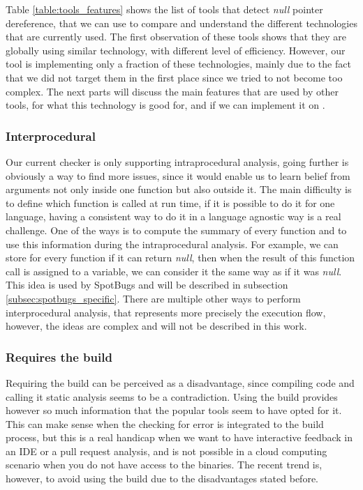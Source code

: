 Table \ref{table:tools_features} shows the list of tools that detect \emph{null} pointer dereference, that we can use to compare and understand the different technologies that are currently used.
The first observation of these tools shows that they are globally using similar technology, with different level of efficiency.
However, our tool is implementing only a fraction of these technologies, mainly due to the fact that we did not target them in the first place since we tried to not become too complex. 
The next parts will discuss the main features that are used by other tools, for what this technology is good for, and if we can implement it on \slang{}.

\subsubsection{Interprocedural}
\label{subsubsec:inter_procedrual}

Our current checker is only supporting intraprocedural analysis, going further is obviously a way to find more issues, since it would enable us to learn belief from arguments not only inside one function but also outside it.
The main difficulty is to define which function is called at run time, if it is possible to do it for one language, having a consistent way to do it in a language agnostic way is a real challenge. 
One of the ways is to compute the summary of every function and to use this information during the intraprocedural analysis. 
For example, we can store for every function if it can return \emph{null}, then when the result of this function call is assigned to a variable, we can consider it the same way as if it was \emph{null}. 
This idea is used by SpotBugs and will be described in subsection \ref{subsec:spotbugs_specific}. 
There are multiple other ways to perform interprocedural analysis, that represents more precisely the execution flow, however, the ideas are complex and will not be described in this work.

\subsubsection{Requires the build}
\label{subsubsec:require_build}

Requiring the build can be perceived as a disadvantage, since compiling code and calling it static analysis seems to be a contradiction.
Using the build provides however so much information that the popular tools seem to have opted for it.
This can make sense when the checking for error is integrated to the build process, but this is a real handicap when we want to have interactive feedback in an IDE or a pull request analysis, and is not possible in a cloud computing scenario when you do not have access to the binaries. 
The recent trend is, however, to avoid using the build due to the disadvantages stated before.

